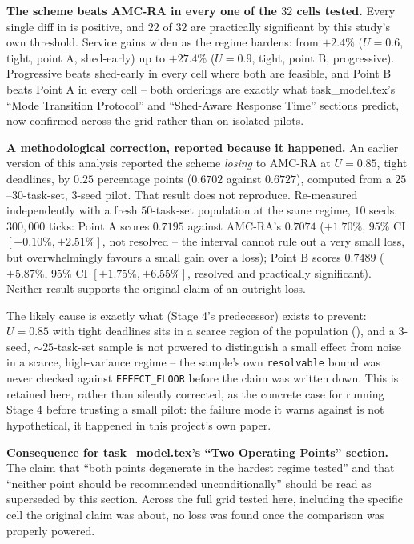 \textbf{The scheme beats AMC-RA in every one of the $32$ cells tested.} Every
single diff in  is positive, and
$22$ of $32$ are practically significant by this study's own threshold.
Service gains widen as the regime hardens: from $+2.4\%$ ($U=0.6$, tight,
point A, shed-early) up to $+27.4\%$ ($U=0.9$, tight, point B, progressive).
Progressive beats shed-early in every cell where both are feasible, and Point B
beats Point A in every cell -- both orderings are exactly what
task\_model.tex's ``Mode Transition Protocol'' and ``Shed-Aware Response Time'' sections predict, now confirmed across the grid
rather than on isolated pilots.

\textbf{A methodological correction, reported because it happened.} An earlier
version of this analysis reported the scheme \emph{losing} to AMC-RA at
$U=0.85$, tight deadlines, by $0.25$ percentage points ($0.6702$ against
$0.6727$), computed from a $25$--$30$-task-set, $3$-seed pilot. That result
does not reproduce. Re-measured independently with a fresh $50$-task-set
population at the same regime, $10$ seeds, $300{,}000$ ticks: Point A scores
$0.7195$ against AMC-RA's $0.7074$ ($+1.70\%$, $95\%$ CI $[-0.10\%, +2.51\%]$,
not resolved -- the interval cannot rule out a very small loss, but overwhelmingly
favours a small gain over a loss); Point B scores $0.7489$ ($+5.87\%$, $95\%$ CI
$[+1.75\%, +6.55\%]$, resolved and practically significant). Neither result
supports the original claim of an outright loss.

The likely cause is exactly what  (Stage 4's predecessor)
exists to prevent: $U=0.85$ with tight deadlines sits in a scarce region of the
population (), and a $3$-seed, $\sim\!25$-task-set
sample is not powered to distinguish a small effect from noise in a scarce,
high-variance regime -- the sample's own \texttt{resolvable} bound was never
checked against \texttt{EFFECT\_FLOOR} before the claim was written down. This
is retained here, rather than silently corrected, as the concrete case for
running Stage 4 before trusting a small pilot: the failure mode it warns
against is not hypothetical, it happened in this project's own paper.

\textbf{Consequence for task\_model.tex's ``Two Operating Points'' section.} The
claim that ``both points degenerate in the hardest regime tested'' and that
``neither point should be recommended unconditionally'' should be read as
superseded by this section. Across the full grid tested here, including the
specific cell the original claim was about, no loss was found once the
comparison was properly powered.

